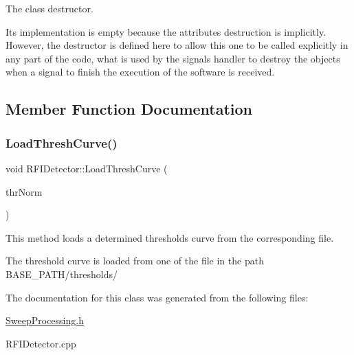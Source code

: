 The class destructor. 

Its implementation is empty because the attributes destruction is implicitly. However, the destructor is defined here to allow this one to be called explicitly in any part of the code, what is used by the signals handler to destroy the objects when a signal to finish the execution of the software is received. 

\subsection{Member Function Documentation}
\mbox{\label{classRFIDetector_a1eba12febd92bba77f658dfe664ea5c6}} 
\subsubsection{\texorpdfstring{Load\+Thresh\+Curve()}{LoadThreshCurve()}}
{\footnotesize\ttfamily void R\+F\+I\+Detector\+::\+Load\+Thresh\+Curve (\begin{DoxyParamCaption}\item[{const \hyperlink{structRFI_a18cfa7d24274bbcd14acc6b513860cb0}{R\+F\+I\+::\+Thresholds\+Norm}}]{thr\+Norm }\end{DoxyParamCaption})}



This method loads a determined thresholds curve from the corresponding file. 

The threshold curve is loaded from one of the file in the path B\+A\+S\+E\+\_\+\+P\+A\+T\+H/thresholds/ 

The documentation for this class was generated from the following files\+:\begin{DoxyCompactItemize}
\item 
\hyperlink{SweepProcessing_8h}{Sweep\+Processing.\+h}\item 
R\+F\+I\+Detector.\+cpp\end{DoxyCompactItemize}
